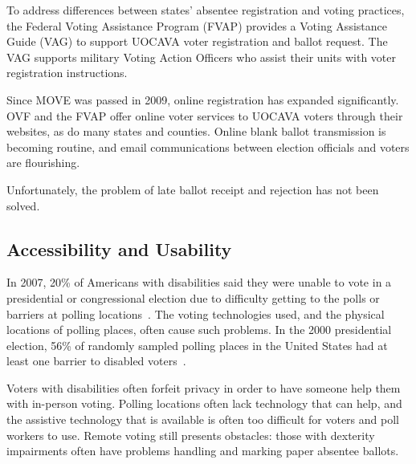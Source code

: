 
To address differences between states' absentee registration and
voting practices, the Federal Voting Assistance Program (FVAP)
provides a Voting Assistance Guide (VAG) to support UOCAVA voter
registration and ballot request. The VAG supports military Voting
Action Officers who assist their units with voter registration
instructions. 

Since MOVE was passed in 2009, online registration has expanded
significantly. OVF and the FVAP offer online voter services to UOCAVA
voters through their websites, as do many states and counties. Online
blank ballot transmission is becoming routine, and email
communications between election officials and voters are flourishing.

Unfortunately, the problem of late ballot receipt and rejection has
not been solved.


\subsection{Accessibility and Usability}

In 2007, 20\% of Americans with disabilities said they were unable to
vote in a presidential or congressional election due to difficulty
getting to the polls or barriers at polling
locations~\cite{runyan2007improving}. The voting technologies used,
and the physical locations of polling places, often cause such
problems. In the 2000 presidential election, 56\% of randomly sampled
polling places in the United States had at least one barrier to
disabled voters~\cite{united2001voters}.

Voters with disabilities often forfeit privacy in order to have
someone help them with in-person voting. Polling locations often lack
technology that can help, and the assistive technology that is
available is often too difficult for voters and poll workers to
use. Remote voting still presents obstacles: those with dexterity
impairments often have problems handling and marking paper absentee
ballots.

